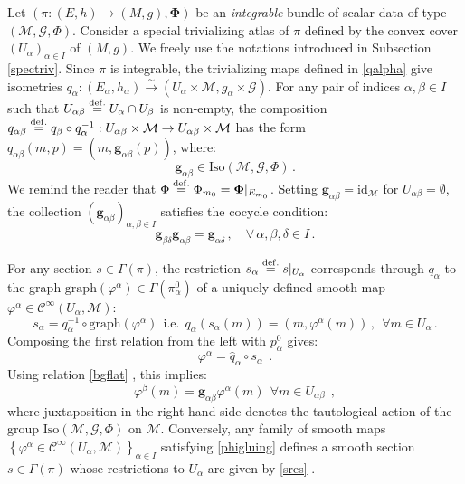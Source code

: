 \documentclass[10pt, cmp, numbook, final, a4paper]{svjour}
\newcommand*{\SavedEqref}{}
\let\SavedEqref\eqref
\renewcommand*{\eqref}[1]{%
  \begingroup
    \hypersetup{
      linkcolor=blue,
      linkbordercolor=blue,
    }%
    \SavedEqref{#1}%
  \endgroup
}
\newcommand{\eqdef}{\stackrel{{\rm def.}}{=}}
\def\graph{\mathrm{graph}}
\newcommand{\be}{\begin{equation*}}
\newcommand{\ee}{\end{equation*}}
\newcommand{\ben}{\begin{equation}}
\newcommand{\een}{\end{equation}}
\newcommand{\id}{\mathrm{id}}
\def\cC{{\mathcal C}}
\newcommand{\cM}{\mathcal{M}}
\def\cG{\mathcal{G}}
\def\cC{\mathcal{C}}
\def\bg{\mathbf{g}}
\def\bPhi{\mathbf{\Phi}}
\def\bg{\mathbf{g}}
\def\Iso{\mathrm{Iso}}
\begin{document}
Let $(\pi:(E,h)\rightarrow (M,g), \bPhi)$ be an {\em integrable}
bundle of scalar data of type $(\cM,\cG,\Phi)$. Consider a special
trivializing atlas of $\pi$ defined by the convex cover
$(U_\alpha)_{\alpha\in I}$ of $(M,g)$.  We freely use the notations
introduced in Subsection \ref{spectriv}. Since $\pi$ is integrable,
the trivializing maps defined in \eqref{qalpha} give isometries
$q_\alpha:(E_\alpha,
h_\alpha)\stackrel{\sim}{\rightarrow}(U_\alpha\times \cM,
g_\alpha\times \cG)$. For any pair of indices $\alpha,\beta\in I$ such
that $U_{\alpha\beta}\eqdef U_\alpha\cap U_\beta$ is non-empty, the
composition $q_{\alpha\beta}\eqdef q_\beta\circ
q_\alpha^{-1}:U_{\alpha\beta}\times \cM\rightarrow
U_{\alpha\beta}\times \cM$ has the form
$q_{\alpha\beta}(m,p)=(m,\bg_{\alpha\beta}(p))$, where:
\be
\bg_{\alpha\beta}\in \Iso(\cM,\cG,\Phi)\, .
\ee
We remind the reader that
$\Phi\eqdef \Phi_{m_0}=\bPhi|_{E_{m_0}}$. Setting
$\bg_{\alpha\beta}=\id_\cM$ for $U_{\alpha\beta}=\emptyset$, the
collection $(\bg_{\alpha\beta})_{\alpha,\beta\in I}$ satisfies the
cocycle condition:
\ben
\label{gcocycle}
\bg_{\beta\delta}\bg_{\alpha\beta}=\bg_{\alpha\delta}\, , \quad \forall\, \alpha,\beta,\delta\in I\, .
\een

\noindent
For any section $s\in \Gamma(\pi)$, the restriction $s_\alpha\eqdef
s|_{U_\alpha}$ corresponds through $q_\alpha$ to the graph
$\graph(\varphi^{\alpha})\in \Gamma(\pi^0_{\alpha})$ of a
uniquely-defined smooth map
$\varphi^{\alpha}\in\cC^\infty(U_\alpha,\cM)$:
\ben
\label{sres}
s_\alpha=q_{\alpha}^{-1}\circ \graph(\varphi^\alpha)~~\mathrm{i.e.}~~q_\alpha(s_\alpha(m))=(m,\varphi^\alpha(m))\, , ~~\forall m\in U_\alpha\, .
\een 
Composing the first relation from the left with $p^0_{\alpha}$ gives:
\be
\varphi^{\alpha}={\hat q}_\alpha\circ s_\alpha~~.
\ee
Using relation \eqref{bgflat}, this implies:
\ben
\label{phigluing}
\varphi^{\beta}(m)=\bg_{\alpha\beta}\varphi^{\alpha}(m)~~\forall m\in U_{\alpha\beta}~~,
\een
where juxtaposition in the right hand side denotes the tautological
action of the group $\Iso(\cM,\cG,\Phi)$ on $\cM$. Conversely, any
family of smooth maps
$\left\{\varphi^{\alpha}\in\cC^\infty(U_\alpha,\cM)\right\}_{\alpha\in
I}$ satisfying \eqref{phigluing} defines a smooth section
$s\in \Gamma(\pi)$ whose restrictions to $U_\alpha$ are given
by \eqref{sres}.
	
\end{document}

